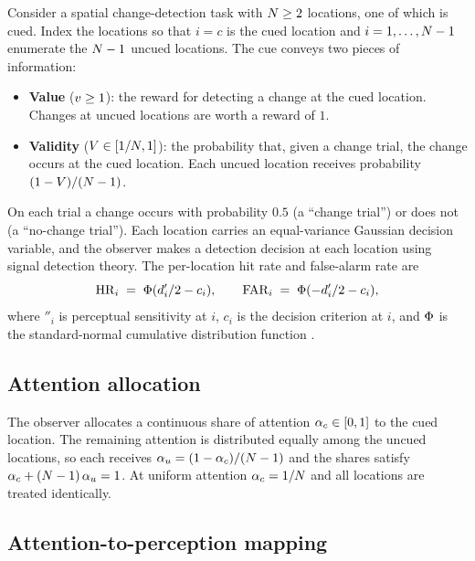 Consider a spatial change-detection task with $N \ge 2$ locations,
one of which is cued. Index the locations so that $i = c$ is the cued
location and $i = 1, \dots, N - 1$ enumerate the $N - 1$ uncued
locations. The cue conveys two pieces of information:
\begin{itemize}
\item \textbf{Value} ($v \ge 1$): the reward for detecting a change
  at the cued location. Changes at uncued locations are worth a reward
  of $1$.
\item \textbf{Validity} ($V \in [1/N, 1]$): the probability
  that, given a change trial, the change occurs at the cued location.
  Each uncued location receives probability $(1 - V)/(N - 1)$.
\end{itemize}
On each trial a change occurs with probability $0.5$ (a ``change
trial'') or does not (a ``no-change trial''). Each location carries an
equal-variance Gaussian decision variable, and the observer makes a
detection decision at each location using signal detection theory. The
per-location hit rate and false-alarm rate are
\begin{equation}
  \mathrm{HR}_i \;=\; \Phi(d'_i/2 - c_i),
  \qquad
  \mathrm{FAR}_i \;=\; \Phi(-d'_i/2 - c_i),
  \label{eq:sdt-marginal}
\end{equation}
where $\dprime_i$ is perceptual sensitivity at $i$, $c_i$ is the
decision criterion at $i$, and $\Phi$ is the standard-normal
cumulative distribution function \cite{MullerFindlay1987,
posner1980_orienting}.

\subsection{Attention allocation}
\label{sec:model-allocation}

The observer allocates a continuous share of attention
$\alpha_c \in [0, 1]$ to the cued location. The remaining attention is
distributed equally among the uncued locations, so each receives
$\alpha_u = (1 - \alpha_c)/(N - 1)$ and the shares satisfy
$\alpha_c + (N - 1)\,\alpha_u = 1$. At uniform attention
$\alpha_c = 1/N$ and all locations are treated identically.

\subsection{Attention-to-perception mapping}
\label{sec:model-mapping}

